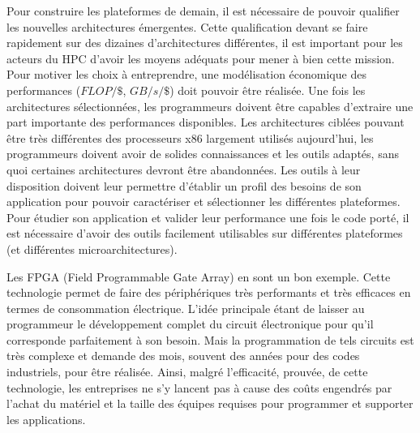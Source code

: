         Pour construire les plateformes de demain, il est nécessaire de pouvoir qualifier les nouvelles architectures émergentes. Cette qualification devant se faire rapidement sur des dizaines d'architectures différentes, il est important pour les acteurs du HPC d'avoir les moyens adéquats pour mener à bien cette mission. Pour motiver les choix à entreprendre, une modélisation économique des performances ($FLOP/\$$, $GB/s/\$$) doit pouvoir être réalisée. Une fois les architectures sélectionnées, les programmeurs doivent être capables d'extraire une part importante des performances disponibles. Les architectures ciblées pouvant être très différentes des processeurs x86 largement utilisés aujourd'hui, les programmeurs doivent avoir de solides connaissances et les outils adaptés, sans quoi certaines architectures devront être abandonnées. Les outils à leur disposition doivent leur permettre d'établir un profil des besoins de son application pour pouvoir caractériser et sélectionner les différentes plateformes. Pour étudier son application et valider leur performance une fois le code porté, il est nécessaire d'avoir des outils facilement utilisables sur différentes plateformes (et différentes microarchitectures).
        
        Les FPGA (Field Programmable Gate Array) en sont un bon exemple. Cette technologie permet de faire des périphériques très performants et très efficaces en termes de consommation électrique. L'idée principale étant de laisser au programmeur le développement complet du circuit électronique pour qu'il corresponde parfaitement à son besoin. Mais la programmation de tels circuits est très complexe et demande des mois, souvent des années pour des codes industriels, pour être réalisée. Ainsi, malgré l'efficacité, prouvée, de cette technologie, les entreprises ne s'y lancent pas à cause des coûts engendrés par l'achat du matériel et la taille des équipes requises pour programmer et supporter les applications. 
        
        
        
